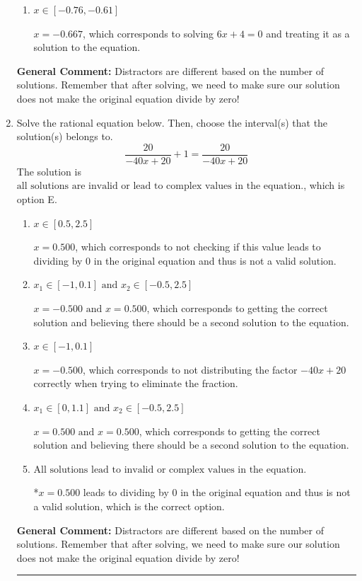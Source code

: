 \documentclass{extbook}[14pt]
\newcommand{\litem}[1]{\item #1

\rule{\textwidth}{0.4pt}}
\begin{document}
\begin{enumerate}
{\begin{enumerate}[label=\Alph*.]
$x = -1.000$, which corresponds to solving $6x + 6 = 0$ and treating it as a solution to the equation.
\item \( x \in [-0.76,-0.61] \)

$x = -0.667$, which corresponds to solving $6x + 4 = 0$ and treating it as a solution to the equation.
\end{enumerate}

\textbf{General Comment:} Distractors are different based on the number of solutions. Remember that after solving, we need to make sure our solution does not make the original equation divide by zero!
}
\litem{
Solve the rational equation below. Then, choose the interval(s) that the solution(s) belongs to.
\[ \frac{20}{-40x + 20} + 1 = \frac{20}{-40x + 20} \]The solution is \( \text{all solutions are invalid or lead to complex values in the equation.} \), which is option E.\begin{enumerate}[label=\Alph*.]
\item \( x \in [0.5,2.5] \)

$x = 0.500$, which corresponds to not checking if this value leads to dividing by 0 in the original equation and thus is not a valid solution.
\item \( x_1 \in [-1, 0.1] \text{ and } x_2 \in [-0.5,2.5] \)

$x = -0.500 \text{ and } x = 0.500$, which corresponds to getting the correct solution and believing there should be a second solution to the equation.
\item \( x \in [-1,0.1] \)

$x = -0.500$, which corresponds to not distributing the factor $-40x + 20$ correctly when trying to eliminate the fraction.
\item \( x_1 \in [0, 1.1] \text{ and } x_2 \in [-0.5,2.5] \)

$x = 0.500 \text{ and } x = 0.500$, which corresponds to getting the correct solution and believing there should be a second solution to the equation.
\item \( \text{All solutions lead to invalid or complex values in the equation.} \)

*$x = 0.500$ leads to dividing by 0 in the original equation and thus is not a valid solution, which is the correct option.
\end{enumerate}

\textbf{General Comment:} Distractors are different based on the number of solutions. Remember that after solving, we need to make sure our solution does not make the original equation divide by zero!
}
\end{enumerate}
\end{document}
